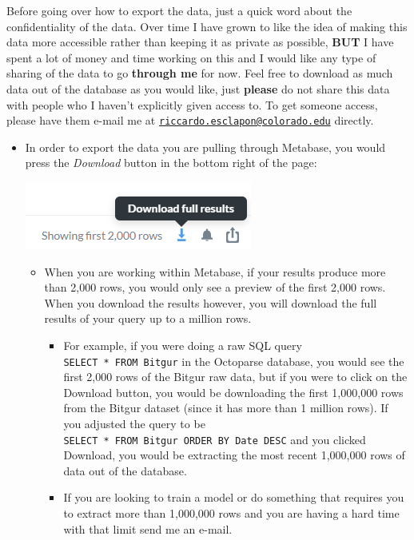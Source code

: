 \documentclass[
]{book}
\begin{document}
Before going over how to export the data, just a quick word about the confidentiality of the data. Over time I have grown to like the idea of making this data more accessible rather than keeping it as private as possible, \textbf{BUT} I have spent a lot of money and time working on this and I would like any type of sharing of the data to go \textbf{through me} for now. Feel free to download as much data out of the database as you would like, just \textbf{please} do not share this data with people who I haven't explicitly given access to. To get someone access, please have them e-mail me at \href{mailto:riccardo.esclapon@colorado.edu}{\nolinkurl{riccardo.esclapon@colorado.edu}} directly.

\begin{itemize}
\item
  In order to export the data you are pulling through Metabase, you would press the \emph{Download} button in the bottom right of the page:

  \includegraphics{images/DownloadFullResults.png}

  \begin{itemize}
  \item
    When you are working within Metabase, if your results produce more than 2,000 rows, you would only see a preview of the first 2,000 rows. When you download the results however, you will download the full results of your query up to a million rows.

    \begin{itemize}
    \item
      For example, if you were doing a raw SQL query \texttt{SELECT\ *\ FROM\ Bitgur} in the Octoparse database, you would see the first 2,000 rows of the Bitgur raw data, but if you were to click on the Download button, you would be downloading the first 1,000,000 rows from the Bitgur dataset (since it has more than 1 million rows). If you adjusted the query to be \texttt{SELECT\ *\ FROM\ Bitgur\ ORDER\ BY\ Date\ DESC} and you clicked Download, you would be extracting the most recent 1,000,000 rows of data out of the database.
    \item
      If you are looking to train a model or do something that requires you to extract more than 1,000,000 rows and you are having a hard time with that limit send me an e-mail.
    \end{itemize}
  \end{itemize}
\end{itemize}
\end{document}
